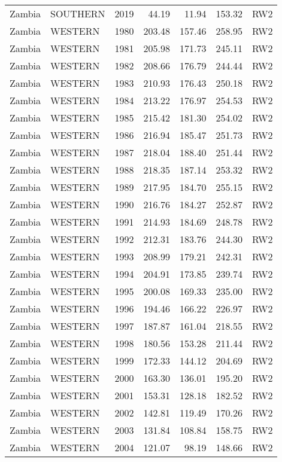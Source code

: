 \begin{longtable}{lllrrrl}
  Zambia & SOUTHERN & 2019 & 44.19 & 11.94 & 153.32 & RW2 \\ 
  Zambia & WESTERN & 1980 & 203.48 & 157.46 & 258.95 & RW2 \\ 
  Zambia & WESTERN & 1981 & 205.98 & 171.73 & 245.11 & RW2 \\ 
  Zambia & WESTERN & 1982 & 208.66 & 176.79 & 244.44 & RW2 \\ 
  Zambia & WESTERN & 1983 & 210.93 & 176.43 & 250.18 & RW2 \\ 
  Zambia & WESTERN & 1984 & 213.22 & 176.97 & 254.53 & RW2 \\ 
  Zambia & WESTERN & 1985 & 215.42 & 181.30 & 254.02 & RW2 \\ 
  Zambia & WESTERN & 1986 & 216.94 & 185.47 & 251.73 & RW2 \\ 
  Zambia & WESTERN & 1987 & 218.04 & 188.40 & 251.44 & RW2 \\ 
  Zambia & WESTERN & 1988 & 218.35 & 187.14 & 253.32 & RW2 \\ 
  Zambia & WESTERN & 1989 & 217.95 & 184.70 & 255.15 & RW2 \\ 
  Zambia & WESTERN & 1990 & 216.76 & 184.27 & 252.87 & RW2 \\ 
  Zambia & WESTERN & 1991 & 214.93 & 184.69 & 248.78 & RW2 \\ 
  Zambia & WESTERN & 1992 & 212.31 & 183.76 & 244.30 & RW2 \\ 
  Zambia & WESTERN & 1993 & 208.99 & 179.21 & 242.31 & RW2 \\ 
  Zambia & WESTERN & 1994 & 204.91 & 173.85 & 239.74 & RW2 \\ 
  Zambia & WESTERN & 1995 & 200.08 & 169.33 & 235.00 & RW2 \\ 
  Zambia & WESTERN & 1996 & 194.46 & 166.22 & 226.97 & RW2 \\ 
  Zambia & WESTERN & 1997 & 187.87 & 161.04 & 218.55 & RW2 \\ 
  Zambia & WESTERN & 1998 & 180.56 & 153.28 & 211.44 & RW2 \\ 
  Zambia & WESTERN & 1999 & 172.33 & 144.12 & 204.69 & RW2 \\ 
  Zambia & WESTERN & 2000 & 163.30 & 136.01 & 195.20 & RW2 \\ 
  Zambia & WESTERN & 2001 & 153.31 & 128.18 & 182.52 & RW2 \\ 
  Zambia & WESTERN & 2002 & 142.81 & 119.49 & 170.26 & RW2 \\ 
  Zambia & WESTERN & 2003 & 131.84 & 108.84 & 158.75 & RW2 \\ 
  Zambia & WESTERN & 2004 & 121.07 & 98.19 & 148.66 & RW2 \\ 

\end{longtable}
